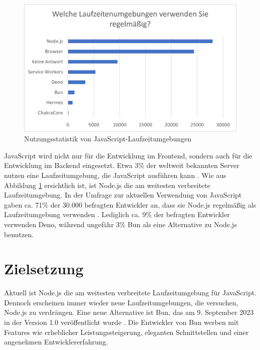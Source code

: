 \begin{figure}[h]
	\centering
	\includegraphics[width=\linewidth]{./images/WhichRuntimesDoYouUseRegularly}
	\caption[Nutzungsstatistik von JavaScript-Laufzeitumgebungen]{Nutzungsstatistik von JavaScript-Laufzeitumgebungen \cite{Greif.2022}}
	\label{fig:runtime-share}
\end{figure}

\noindent
JavaScript wird nicht nur für die Entwicklung im Frontend, sondern auch für die Entwicklung im Backend 
eingesetzt. Etwa 3\% der weltweit bekannten Server nutzen eine Laufzeitumgebung, die JavaScript 
ausführen kann \cite{QSuccess.2023}. Wie aus Abbildung \ref{fig:runtime-share} ersichtlich ist, ist Node.js die am weitesten verbreitete Laufzeitumgebung. In der Umfrage zur aktuellen Verwendung von JavaScript gaben ca. 71\% der 30.000 befragten Entwickler an, dass sie Node.js regelmäßig als Laufzeitumgebung verwenden \cite{Greif.2022}.
Lediglich ca. 9\% der befragten Entwickler verwenden Deno, während ungefähr 3\% Bun als eine Alternative zu Node.js benutzen.


\section{Zielsetzung} \label{sec:introduction-target}
Aktuell ist Node.js die am weitesten verbreitete Laufzeitumgebung für JavaScript. Dennoch erscheinen immer wieder neue Laufzeitumgebungen, die versuchen, Node.js zu verdrängen. Eine neue Alternative ist Bun, das am 9. September 2023 in der Version 1.0 veröffentlicht wurde \cite{Sumner.2023c}. Die Entwickler von Bun werben mit Features wie erheblicher Leistungssteigerung, eleganten Schnittstellen und einer angenehmen Entwicklererfahrung.\\

